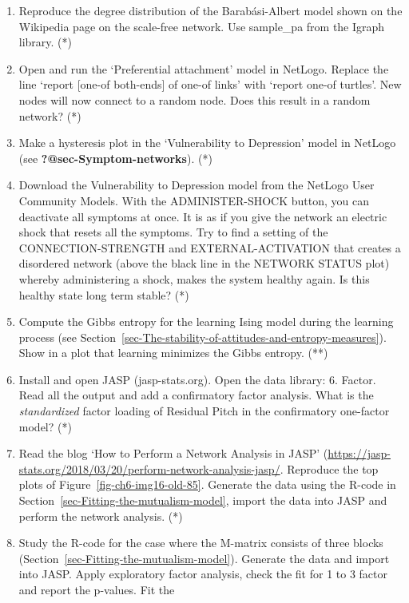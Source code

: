 \documentclass[
  a4paper,
  DIV=11,
  numbers=noendperiod,
  oneside]{scrreprt}
\begin{document}
\begin{enumerate}
\def\labelenumi{\arabic{enumi})}
\item
  Reproduce the degree distribution of the Barabási-Albert model shown
  on the Wikipedia page on the scale-free network. Use sample\_pa from
  the Igraph library. (*)
\item
  Open and run the `Preferential attachment' model in NetLogo. Replace
  the line `report {[}one-of both-ends{]} of one-of links' with `report
  one-of turtles'. New nodes will now connect to a random node. Does
  this result in a random network? (*)
\item
  Make a hysteresis plot in the `Vulnerability to Depression' model in
  NetLogo (see \textbf{?@sec-Symptom-networks}). (*)
\item
  Download the Vulnerability to Depression model from the NetLogo User
  Community Models. With the ADMINISTER-SHOCK button, you can deactivate
  all symptoms at once. It is as if you give the network an electric
  shock that resets all the symptoms. Try to find a setting of the
  CONNECTION-STRENGTH and EXTERNAL-ACTIVATION that creates a disordered
  network (above the black line in the NETWORK STATUS plot) whereby
  administering a shock, makes the system healthy again. Is this healthy
  state long term stable? (*)
\item
  Compute the Gibbs entropy for the learning Ising model during the
  learning process (see
  Section~\ref{sec-The-stability-of-attitudes-and-entropy-measures}).
  Show in a plot that learning minimizes the Gibbs entropy. (**)
\item
  Install and open JASP (jasp-stats.org). Open the data library: 6.
  Factor. Read all the output and add a confirmatory factor analysis.
  What is the \emph{standardized} factor loading of Residual Pitch in
  the confirmatory one-factor model? (*)
\item
  Read the blog `How to Perform a Network Analysis in JASP'
  (\url{https://jasp-stats.org/2018/03/20/perform-network-analysis-jasp/}.
  Reproduce the top plots of Figure~\ref{fig-ch6-img16-old-85}. Generate
  the data using the R-code in
  Section~\ref{sec-Fitting-the-mutualism-model}, import the data into
  JASP and perform the network analysis. (*)
\item
  Study the R-code for the case where the M-matrix consists of three
  blocks (Section~\ref{sec-Fitting-the-mutualism-model}). Generate the
  data and import into JASP. Apply exploratory factor analysis, check
  the fit for 1 to 3 factor and report the p-values. Fit the

\end{enumerate}
\end{document}
